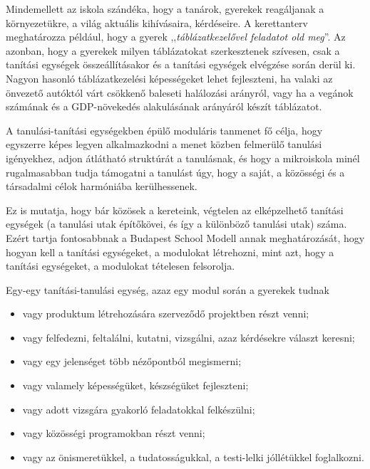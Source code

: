 Mindemellett az iskola szándéka, hogy a tanárok, gyerekek reagáljanak a környezetükre, a világ aktuális kihívásaira, kérdéseire. A kerettanterv meghatározza például, hogy a gyerek ,,\emph{táblázatkezelővel feladatot old meg}''. Az azonban, hogy a gyerekek milyen táblázatokat szerkesztenek szívesen, csak a tanítási egységek összeállításakor és a tanítási egységek elvégzése során derül ki. Nagyon hasonló táblázatkezelési képességeket lehet fejleszteni, ha valaki az önvezető autóktól várt csökkenő baleseti halálozási arányról, vagy ha a vegánok számának és a GDP-növekedés alakulásának arányáról készít táblázatot.

A tanulási-tanítási egységekben épülő moduláris tanmenet fő célja, hogy egyszerre képes legyen alkalmazkodni a menet közben felmerülő tanulási igényekhez, adjon átlátható struktúrát a tanulásnak, és hogy a mikroiskola minél rugalmasabban tudja támogatni a tanulást úgy, hogy a saját, a közösségi és a társadalmi célok harmóniába kerülhessenek.

Ez is mutatja, hogy bár közösek a kereteink, végtelen az elképzelhető tanítási egységek (a tanulási utak építőkövei, és így a különböző tanulási utak) száma. Ezért tartja fontosabbnak a Budapest School Modell annak meghatározását, hogy hogyan kell a tanítási egységeket, a modulokat létrehozni, mint azt, hogy a tanítási egységeket, a modulokat tételesen felsorolja.

Egy-egy tanítási-tanulási egység, azaz egy modul során a gyerekek tudnak

\begin{itemize}
      \item vagy produktum létrehozására szerveződő projektben részt venni;

      \item vagy felfedezni, feltalálni, kutatni, vizsgálni, azaz kérdésekre választ keresni;

      \item vagy egy jelenséget több nézőpontból megismerni;

      \item vagy valamely képességüket, készségüket fejleszteni;

      \item vagy adott vizsgára gyakorló feladatokkal felkészülni;

      \item vagy közösségi programokban részt venni;

      \item vagy az önismeretükkel, a tudatosságukkal, a testi-lelki jóllétükkel fog\-lal\-kozni.
\end{itemize}

